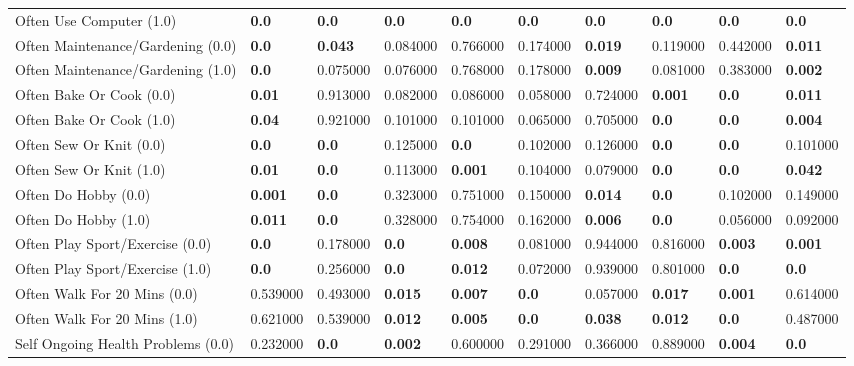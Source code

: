 \begin{tabular}{llllllllll}
Often Use Computer (1.0) & \textbf{0.0} & \textbf{0.0} & \textbf{0.0} & \textbf{0.0} & \textbf{0.0} & \textbf{0.0} & \textbf{0.0} & \textbf{0.0} & \textbf{0.0} \\
Often Maintenance/Gardening (0.0) & \textbf{0.0} & \textbf{0.043} & 0.084000 & 0.766000 & 0.174000 & \textbf{0.019} & 0.119000 & 0.442000 & \textbf{0.011} \\
Often Maintenance/Gardening (1.0) & \textbf{0.0} & 0.075000 & 0.076000 & 0.768000 & 0.178000 & \textbf{0.009} & 0.081000 & 0.383000 & \textbf{0.002} \\
Often Bake Or Cook (0.0) & \textbf{0.01} & 0.913000 & 0.082000 & 0.086000 & 0.058000 & 0.724000 & \textbf{0.001} & \textbf{0.0} & \textbf{0.011} \\
Often Bake Or Cook (1.0) & \textbf{0.04} & 0.921000 & 0.101000 & 0.101000 & 0.065000 & 0.705000 & \textbf{0.0} & \textbf{0.0} & \textbf{0.004} \\
Often Sew Or Knit (0.0) & \textbf{0.0} & \textbf{0.0} & 0.125000 & \textbf{0.0} & 0.102000 & 0.126000 & \textbf{0.0} & \textbf{0.0} & 0.101000 \\
Often Sew Or Knit (1.0) & \textbf{0.01} & \textbf{0.0} & 0.113000 & \textbf{0.001} & 0.104000 & 0.079000 & \textbf{0.0} & \textbf{0.0} & \textbf{0.042} \\
Often Do Hobby (0.0) & \textbf{0.001} & \textbf{0.0} & 0.323000 & 0.751000 & 0.150000 & \textbf{0.014} & \textbf{0.0} & 0.102000 & 0.149000 \\
Often Do Hobby (1.0) & \textbf{0.011} & \textbf{0.0} & 0.328000 & 0.754000 & 0.162000 & \textbf{0.006} & \textbf{0.0} & 0.056000 & 0.092000 \\
Often Play Sport/Exercise (0.0) & \textbf{0.0} & 0.178000 & \textbf{0.0} & \textbf{0.008} & 0.081000 & 0.944000 & 0.816000 & \textbf{0.003} & \textbf{0.001} \\
Often Play Sport/Exercise (1.0) & \textbf{0.0} & 0.256000 & \textbf{0.0} & \textbf{0.012} & 0.072000 & 0.939000 & 0.801000 & \textbf{0.0} & \textbf{0.0} \\
Often Walk For 20 Mins (0.0) & 0.539000 & 0.493000 & \textbf{0.015} & \textbf{0.007} & \textbf{0.0} & 0.057000 & \textbf{0.017} & \textbf{0.001} & 0.614000 \\
Often Walk For 20 Mins (1.0) & 0.621000 & 0.539000 & \textbf{0.012} & \textbf{0.005} & \textbf{0.0} & \textbf{0.038} & \textbf{0.012} & \textbf{0.0} & 0.487000 \\
Self Ongoing Health Problems (0.0) & 0.232000 & \textbf{0.0} & \textbf{0.002} & 0.600000 & 0.291000 & 0.366000 & 0.889000 & \textbf{0.004} & \textbf{0.0} \\

\end{tabular}
